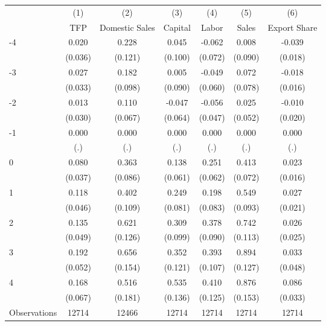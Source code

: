 \begin{tabular}{l*{6}{c}}
\hline\hline
                    &\multicolumn{1}{c}{(1)}&\multicolumn{1}{c}{(2)}&\multicolumn{1}{c}{(3)}&\multicolumn{1}{c}{(4)}&\multicolumn{1}{c}{(5)}&\multicolumn{1}{c}{(6)}\\
                    &\multicolumn{1}{c}{TFP}&\multicolumn{1}{c}{Domestic Sales}&\multicolumn{1}{c}{Capital}&\multicolumn{1}{c}{Labor}&\multicolumn{1}{c}{Sales}&\multicolumn{1}{c}{Export Share}\\
\hline
-4                  &       0.020&       0.228&       0.045&      -0.062&       0.008&      -0.039\\
                    &     (0.036)&     (0.121)&     (0.100)&     (0.072)&     (0.090)&     (0.018)\\
[1em]
-3                  &       0.027&       0.182&       0.005&      -0.049&       0.072&      -0.018\\
                    &     (0.033)&     (0.098)&     (0.090)&     (0.060)&     (0.078)&     (0.016)\\
[1em]
-2                  &       0.013&       0.110&      -0.047&      -0.056&       0.025&      -0.010\\
                    &     (0.030)&     (0.067)&     (0.064)&     (0.047)&     (0.052)&     (0.020)\\
[1em]
-1                  &       0.000&       0.000&       0.000&       0.000&       0.000&       0.000\\
                    &         (.)&         (.)&         (.)&         (.)&         (.)&         (.)\\
[1em]
0                   &       0.080&       0.363&       0.138&       0.251&       0.413&       0.023\\
                    &     (0.037)&     (0.086)&     (0.061)&     (0.062)&     (0.072)&     (0.016)\\
[1em]
1                   &       0.118&       0.402&       0.249&       0.198&       0.549&       0.027\\
                    &     (0.046)&     (0.109)&     (0.081)&     (0.083)&     (0.093)&     (0.021)\\
[1em]
2                   &       0.135&       0.621&       0.309&       0.378&       0.742&       0.026\\
                    &     (0.049)&     (0.126)&     (0.099)&     (0.090)&     (0.113)&     (0.025)\\
[1em]
3                   &       0.192&       0.656&       0.352&       0.393&       0.894&       0.033\\
                    &     (0.052)&     (0.154)&     (0.121)&     (0.107)&     (0.127)&     (0.048)\\
[1em]
4                   &       0.168&       0.516&       0.535&       0.410&       0.876&       0.086\\
                    &     (0.067)&     (0.181)&     (0.136)&     (0.125)&     (0.153)&     (0.033)\\
\hline
Observations        &       12714&       12466&       12714&       12714&       12714&       12714\\
\hline\hline
\end{tabular}
